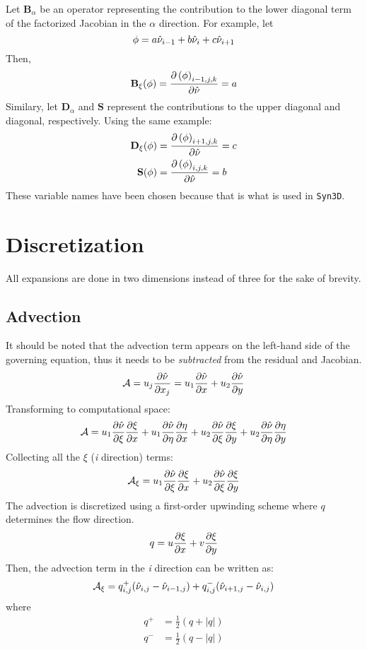 \documentclass{SelimArticle}
\begin{document}
Let $\mathbf{B}_\alpha$ be an operator representing the contribution to the lower diagonal term
of the factorized Jacobian in the $\alpha$ direction. For example, let
$$
\phi = a\hat{\nu}_{i-1} + b\hat{\nu}_{i} + c\hat{\nu}_{i+1}
$$
Then,
$$
\mathbf{B}_\xi(\phi) =  \frac{\partial \left(\phi\right)_{i-1,j,k}}{\partial \hat{\nu}}  = a
$$
Similary, let $\mathbf{D}_\alpha$ and $\mathbf{S}$ represent the contributions to the
upper diagonal and diagonal, respectively. Using the same example:
\begin{align*}
    \mathbf{D}_\xi(\phi) &=  \frac{\partial \left(\phi\right)_{i+1,j,k}}{\partial \hat{\nu}}  = c\\
    \mathbf{S}(\phi) &=  \frac{\partial \left(\phi\right)_{i,j,k}}{\partial \hat{\nu}}  = b
\end{align*}
These variable names have been chosen because that is what is used in \texttt{Syn3D}.

\section{Discretization}
All expansions are done in two dimensions instead of three for the sake of brevity.


\subsection{Advection}
It should be noted that the advection term appears on the left-hand side of the governing equation,
thus it needs to be \textit{subtracted} from the residual and Jacobian.
\begin{equation*}
    \mathcal{A} = u_j \frac{\partial \hat{\nu}}{\partial x_j}  = u_1 \frac{\partial \hat{\nu}}{\partial x}  + u_2 \frac{\partial \hat{\nu}}{\partial y} 
\end{equation*}
Transforming to computational space:
\begin{equation*}
    \mathcal{A} = u_1 \frac{\partial \hat{\nu}}{\partial \xi}  \frac{\partial \xi}{\partial x}  + u_1 \frac{\partial \hat{\nu}}{\partial \eta}  \frac{\partial \eta}{\partial x} 
        + u_2 \frac{\partial \hat{\nu}}{\partial \xi}  \frac{\partial \xi}{\partial y}  + u_2 \frac{\partial \hat{\nu}}{\partial \eta}  \frac{\partial \eta}{\partial y} 
\end{equation*}
Collecting all the $\xi$ (\textit{i} direction) terms:
\begin{equation*}
    \mathcal{A}_\xi = u_1 \frac{\partial \hat{\nu}}{\partial \xi}  \frac{\partial \xi}{\partial x}  + u_2 \frac{\partial \hat{\nu}}{\partial \xi}  \frac{\partial \xi}{\partial y} 
\end{equation*}
The advection is discretized using a first-order upwinding scheme
where $q$ determines the flow direction.
$$
q = u \frac{\partial \xi}{\partial x}  + v \frac{\partial \xi}{\partial y} 
$$
Then, the advection term in the \textit{i} direction can be written as:
$$
\mathcal{A}_\xi = q^+_{i,j} (\hat{\nu}_{i,j} - \hat{\nu}_{i-1,j}) + q^-_{i,j}(\hat{\nu}_{i+1,j} - \hat{\nu}_{i,j})
$$
where
\begin{align*}
    q^+ &= \frac{1}{2}\left( q + |q| \right)\\
    q^- &= \frac{1}{2}\left( q - |q| \right)
\end{align*}
\end{document}
